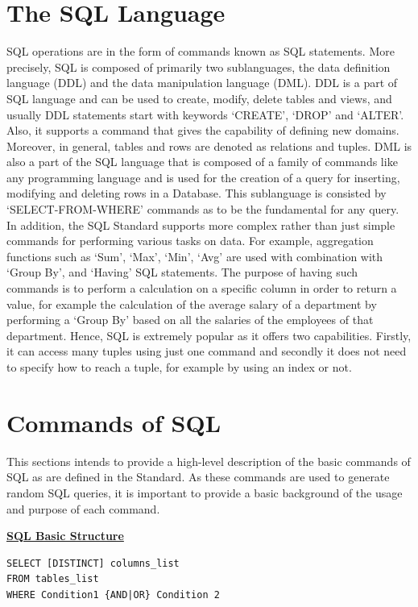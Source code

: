 \section{The SQL Language}
SQL operations are in the form of commands known as SQL statements. More precisely, SQL is composed of primarily two sublanguages, the data definition language (DDL) and the data manipulation language (DML). DDL is a part of SQL language and can be used to create, modify, delete tables and views, and usually DDL statements start with keywords ‘CREATE’, ‘DROP’ and ‘ALTER’. Also, it supports a command that gives the capability of defining new domains. Moreover, in general, tables and rows are denoted as relations and tuples. DML is also a part of the SQL language that is composed of a family of commands like any programming language and is used for the creation of a query for inserting, modifying and deleting rows in a Database. This sublanguage is consisted by ‘SELECT-FROM-WHERE’ commands as to be the fundamental for any query. In addition, the SQL Standard supports more complex rather than just simple commands for performing various tasks on data. For example, aggregation functions such as ‘Sum’, ‘Max’, ‘Min’, ‘Avg’ are used with combination with ‘Group By’, and ‘Having’ SQL statements. The purpose of having such commands is to perform a calculation on a specific column in order to return a value, for example the calculation of the average salary of a department by performing a ‘Group By’ based on all the salaries of the employees of that department. 
Hence, SQL is extremely popular as it offers two capabilities. Firstly, it can access many tuples using just one command and secondly it does not need to specify how to reach a tuple, for example by using an index or not. 


\section{Commands of SQL}
This sections intends to provide a high-level description of the basic commands of SQL as are defined in the Standard. As these commands are used to generate random SQL queries, it is important to provide a basic background of the usage and purpose of each command. 

\hfill\newline
\noindent\textbf{\underline{SQL Basic Structure}} 
\begin{mdframed}[nobreak=true, backgroundcolor=lightgray!20] 
\begin{lstlisting}[style=SQL]
SELECT [DISTINCT] columns_list
FROM tables_list
WHERE Condition1 {AND|OR} Condition 2
\end{lstlisting}
\end{mdframed}

